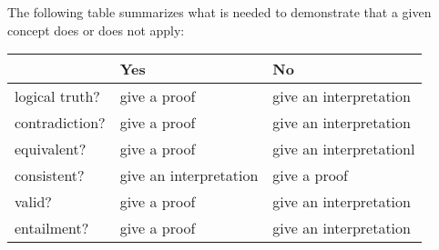 The following table summarizes what is needed to demonstrate that a given concept does or does not apply:
\begin{center}
\begin{tabular}{l l l}
 & \textbf{Yes} & \textbf{No}\\
 \hline
logical truth? & give a proof & give an interpretation\\
contradiction? &  give a proof  & give an interpretation\\
equivalent? & give a proof & give an interpretationl\\
consistent? & give an interpretation & give a proof\\
valid? & give a proof & give an interpretation\\
entailment? & give a proof & give an interpretation\\
\end{tabular}
\end{center}


\practiceproblems

%

